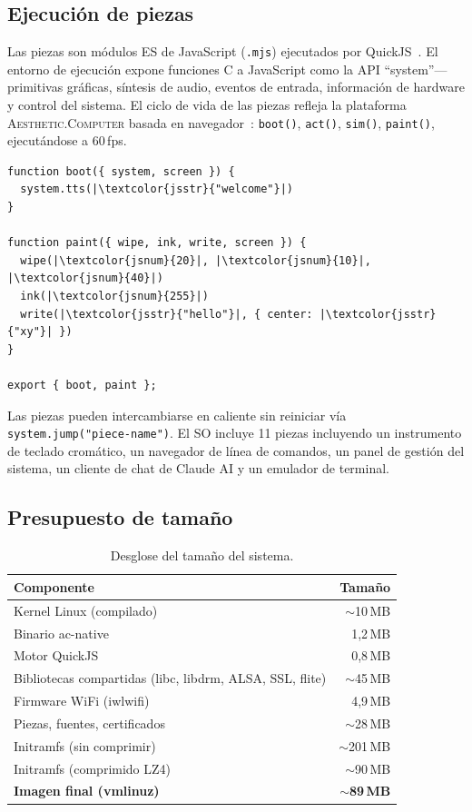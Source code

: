 \documentclass[10pt,letterpaper,twocolumn]{article}
\newcommand{\ac}{\textsc{Aesthetic.Computer}}
\begin{document}
\subsection{Ejecución de piezas}

Las piezas son módulos ES de JavaScript (\texttt{.mjs}) ejecutados por QuickJS~\citep{bellard2005quickjs}. El entorno de ejecución expone funciones C a JavaScript como la API ``system''---primitivas gráficas, síntesis de audio, eventos de entrada, información de hardware y control del sistema. El ciclo de vida de las piezas refleja la plataforma \ac{} basada en navegador~\citep{scudder2026ac}: \texttt{boot()}, \texttt{act()}, \texttt{sim()}, \texttt{paint()}, ejecutándose a 60\,fps.

\begin{lstlisting}[style=acjsstyle]
function boot({ system, screen }) {
  system.tts(|\textcolor{jsstr}{"welcome"}|)
}

function paint({ wipe, ink, write, screen }) {
  wipe(|\textcolor{jsnum}{20}|, |\textcolor{jsnum}{10}|, |\textcolor{jsnum}{40}|)
  ink(|\textcolor{jsnum}{255}|)
  write(|\textcolor{jsstr}{"hello"}|, { center: |\textcolor{jsstr}{"xy"}| })
}

export { boot, paint };
\end{lstlisting}

Las piezas pueden intercambiarse en caliente sin reiniciar vía \texttt{system.jump("piece-name")}. El SO incluye 11 piezas incluyendo un instrumento de teclado cromático, un navegador de línea de comandos, un panel de gestión del sistema, un cliente de chat de Claude AI y un emulador de terminal.

\subsection{Presupuesto de tamaño}

\begin{table}[h]
\small
\centering
\begin{tabular}{lr}
\toprule
\textbf{Componente} & \textbf{Tamaño} \\
\midrule
Kernel Linux (compilado) & $\sim$10\,MB \\
Binario ac-native & 1,2\,MB \\
Motor QuickJS & 0,8\,MB \\
Bibliotecas compartidas (libc, libdrm, ALSA, SSL, flite) & $\sim$45\,MB \\
Firmware WiFi (iwlwifi) & 4,9\,MB \\
Piezas, fuentes, certificados & $\sim$28\,MB \\
\midrule
Initramfs (sin comprimir) & $\sim$201\,MB \\
Initramfs (comprimido LZ4) & $\sim$90\,MB \\
\textbf{Imagen final (vmlinuz)} & \textbf{$\sim$89\,MB} \\
\bottomrule
\end{tabular}
\caption{Desglose del tamaño del sistema.}
\label{tab:size}
\end{table}
\end{document}
